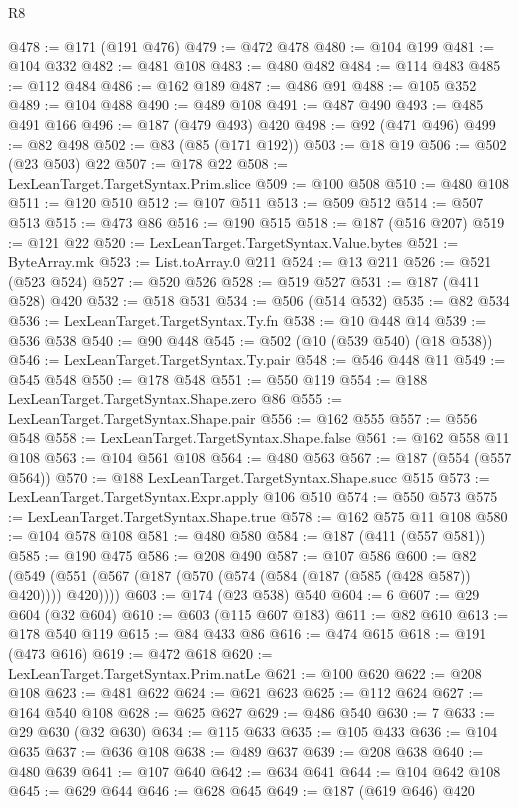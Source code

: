 \begin{lexlean}{R8}
\begin{coremodule}
@478 := @171 (@191 @476)
@479 := @472 @478
@480 := @104 @199
@481 := @104 @332
@482 := @481 @108
@483 := @480 @482
@484 := @114 @483
@485 := @112 @484
@486 := @162 @189
@487 := @486 @91
@488 := @105 @352
@489 := @104 @488
@490 := @489 @108
@491 := @487 @490
@493 := @485 @491 @166
@496 := @187 (@479 @493) @420
@498 := @92 (@471 @496)
@499 := @82 @498
@502 := @83 (@85 (@171 @192))
@503 := @18 @19
@506 := @502 (@23 @503) @22
@507 := @178 @22
@508 := LexLeanTarget.TargetSyntax.Prim.slice
@509 := @100 @508
@510 := @480 @108
@511 := @120 @510
@512 := @107 @511
@513 := @509 @512
@514 := @507 @513
@515 := @473 @86
@516 := @190 @515
@518 := @187 (@516 @207)
@519 := @121 @22
@520 := LexLeanTarget.TargetSyntax.Value.bytes
@521 := ByteArray.mk
@523 := List.toArray.{0} @211
@524 := @13 @211
@526 := @521 (@523 @524)
@527 := @520 @526
@528 := @519 @527
@531 := @187 (@411 @528) @420
@532 := @518 @531
@534 := @506 (@514 @532)
@535 := @82 @534
@536 := LexLeanTarget.TargetSyntax.Ty.fn
@538 := @10 @448 @14
@539 := @536 @538
@540 := @90 @448
@545 := @502 (@10 (@539 @540) (@18 @538))
@546 := LexLeanTarget.TargetSyntax.Ty.pair
@548 := @546 @448 @11
@549 := @545 @548
@550 := @178 @548
@551 := @550 @119
@554 := @188 LexLeanTarget.TargetSyntax.Shape.zero @86
@555 := LexLeanTarget.TargetSyntax.Shape.pair
@556 := @162 @555
@557 := @556 @548
@558 := LexLeanTarget.TargetSyntax.Shape.false
@561 := @162 @558 @11 @108
@563 := @104 @561 @108
@564 := @480 @563
@567 := @187 (@554 (@557 @564))
@570 := @188 LexLeanTarget.TargetSyntax.Shape.succ @515
@573 := LexLeanTarget.TargetSyntax.Expr.apply @106 @510
@574 := @550 @573
@575 := LexLeanTarget.TargetSyntax.Shape.true
@578 := @162 @575 @11 @108
@580 := @104 @578 @108
@581 := @480 @580
@584 := @187 (@411 (@557 @581))
@585 := @190 @475
@586 := @208 @490
@587 := @107 @586
@600 := @82 (@549 (@551 (@567 (@187 (@570 (@574 (@584 (@187 (@585 (@428 @587)) @420)))) @420))))
@603 := @174 (@23 @538) @540
@604 := 6
@607 := @29 @604 (@32 @604)
@610 := @603 (@115 @607 @183)
@611 := @82 @610
@613 := @178 @540 @119
@615 := @84 @433 @86
@616 := @474 @615
@618 := @191 (@473 @616)
@619 := @472 @618
@620 := LexLeanTarget.TargetSyntax.Prim.natLe
@621 := @100 @620
@622 := @208 @108
@623 := @481 @622
@624 := @621 @623
@625 := @112 @624
@627 := @164 @540 @108
@628 := @625 @627
@629 := @486 @540
@630 := 7
@633 := @29 @630 (@32 @630)
@634 := @115 @633
@635 := @105 @433
@636 := @104 @635
@637 := @636 @108
@638 := @489 @637
@639 := @208 @638
@640 := @480 @639
@641 := @107 @640
@642 := @634 @641
@644 := @104 @642 @108
@645 := @629 @644
@646 := @628 @645
@649 := @187 (@619 @646) @420

\end{coremodule}
\end{lexlean}
